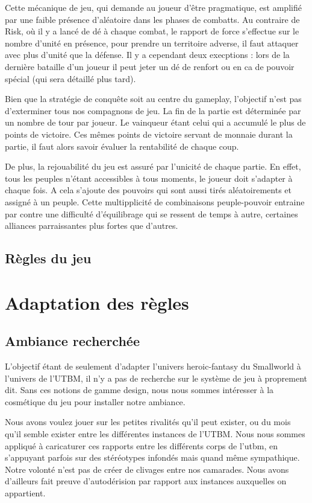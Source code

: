 \documentclass[11pt]{report}
\begin{document}
		Cette mécanique de jeu, qui demande au joueur d'être pragmatique, est amplifié par une faible présence d'aléatoire dans les phases de combatts. Au contraire de Risk\up{\copyright}, où il y a lancé de dé à chaque combat, le rapport de force s'effectue sur le nombre d'unité en présence, pour prendre un territoire adverse, il faut attaquer avec plus d'unité que la défense. Il y a cependant deux execptions : lors de la dernière bataille d'un joueur il peut jeter un dé de renfort ou en ca de pouvoir spécial (qui sera détaillé plus tard).
		
		Bien que la stratégie de conquête soit au centre du gameplay, l'objectif n'est pas d'exterminer tous nos compagnons de jeu. La fin de la partie est déterminée par un nombre de tour par joueur. Le vainqueur étant celui qui a accumulé le plus de points de victoire. Ces mêmes points de victoire servant de monnaie durant la partie, il faut alors savoir évaluer la rentabilité de chaque coup. 
		
		De plus, la rejouabilité du jeu est assuré par l'unicité de chaque partie. En effet, tous les peuples n'étant accessibles à tous moments, le joueur doit s'adapter à chaque fois. A cela s'ajoute des pouvoirs qui sont aussi tirés aléatoirements et assigné à un peuple. Cette multipplicité de combinaisons peuple-pouvoir entraine par contre une difficulté d'équilibrage qui se ressent de temps à autre, certaines alliances parraissantes plus fortes que d'autres.
	\section{Règles du jeu}

\chapter{Adaptation des règles}

	\section{Ambiance recherchée}
	
	L'objectif étant de seulement d'adapter l'univers heroic-fantasy du Smallworld\up{\copyright} à l'univers de l'UTBM, il n'y a pas de recherche sur le système de jeu à proprement dit. Sans ces notions de gamme design, nous nous sommes intéresser à la cosmétique du jeu pour installer notre ambiance. 
	
	Nous avons voulez jouer sur les petites rivalités qu'il peut exister, ou du mois qu'il semble exister entre les différentes instances de l'UTBM. Nous nous sommes appliqué à caricaturer ces rapports entre les différents corps de l'utbm, en s'appuyant parfois sur des stéréotypes infondés mais quand même sympathique. Notre volonté n'est pas de créer de clivages entre nos camarades. Nous avons d'ailleurs fait preuve d'autodérision par rapport aux instances auxquelles on appartient. 
	
\end{document}
